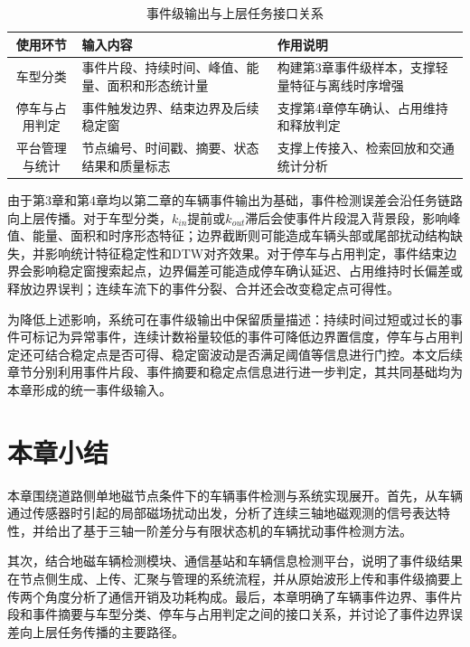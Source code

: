 \documentclass{xdupgthesis}
\providecommand{\FloatBarrier}{}
\begin{document}
\begin{table}[!htbp]
    \centering
    \caption{事件级输出与上层任务接口关系}
    \label{tab:ch2_event_interface}
    \begin{tabular}{c C{5.1cm} C{6.1cm}}
        \toprule
        使用环节 & 输入内容 & 作用说明 \\
        \midrule
        车型分类 & 事件片段、持续时间、峰值、能量、面积和形态统计量 & 构建第3章事件级样本，支撑轻量特征与离线时序增强 \\
        停车与占用判定 & 事件触发边界、结束边界及后续稳定窗 & 支撑第4章停车确认、占用维持和释放判定 \\
        平台管理与统计 & 节点编号、时间戳、摘要、状态结果和质量标志 & 支撑上传接入、检索回放和交通统计分析 \\
        \bottomrule
    \end{tabular}
\end{table}

由于第3章和第4章均以第二章的车辆事件输出为基础，事件检测误差会沿任务链路向上层传播。对于车型分类，$k_{in}$提前或$k_{out}$滞后会使事件片段混入背景段，影响峰值、能量、面积和时序形态特征；边界截断则可能造成车辆头部或尾部扰动结构缺失，并影响统计特征稳定性和DTW对齐效果。对于停车与占用判定，事件结束边界会影响稳定窗搜索起点，边界偏差可能造成停车确认延迟、占用维持时长偏差或释放边界误判；连续车流下的事件分裂、合并还会改变稳定点可得性。

为降低上述影响，系统可在事件级输出中保留质量描述：持续时间过短或过长的事件可标记为异常事件，连续计数裕量较低的事件可降低边界置信度，停车与占用判定还可结合稳定点是否可得、稳定窗波动是否满足阈值等信息进行门控。本文后续章节分别利用事件片段、事件摘要和稳定点信息进行进一步判定，其共同基础均为本章形成的统一事件级输入。

\FloatBarrier

\section{本章小结}
\label{sec:ch2_summary}

本章围绕道路侧单地磁节点条件下的车辆事件检测与系统实现展开。首先，从车辆通过传感器时引起的局部磁场扰动出发，分析了连续三轴地磁观测的信号表达特性，并给出了基于三轴一阶差分与有限状态机的车辆扰动事件检测方法。

其次，结合地磁车辆检测模块、通信基站和车辆信息检测平台，说明了事件级结果在节点侧生成、上传、汇聚与管理的系统流程，并从原始波形上传和事件级摘要上传两个角度分析了通信开销及功耗构成。最后，本章明确了车辆事件边界、事件片段和事件摘要与车型分类、停车与占用判定之间的接口关系，并讨论了事件边界误差向上层任务传播的主要路径。
\end{document}
